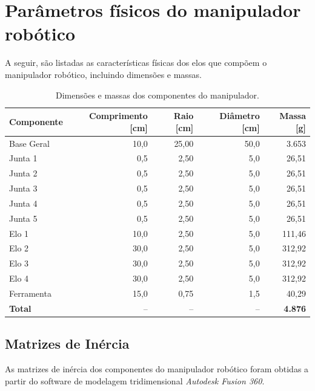 \chapter{Parâmetros físicos do manipulador robótico} 
\label{ApendiceB}
A seguir, são listadas as características físicas dos elos que compõem o manipulador robótico, incluindo dimensões e massas.


\begin{table}[H]
\centering
{\setlength{\tabcolsep}{6pt} 
\caption{Dimensões e massas dos componentes do manipulador.}
\label{tab:dimensoes_massas_cm_g}
\begin{tabular}{l rrrr}
\hline
\textbf{Componente} & \textbf{Comprimento [cm]} & \textbf{Raio [cm]} & \textbf{Diâmetro [cm]} & \textbf{Massa [g]} \\
\hline
Base Geral   & 10,0   & 25,00  & 50,0  & 3.653   \\
Junta 1      & 0,5  & 2,50   & 5,0   & 26,51  \\
Junta 2      & 0,5  & 2,50   & 5,0   & 26,51  \\
Junta 3      & 0,5  & 2,50   & 5,0   & 26,51  \\
Junta 4      & 0,5  & 2,50  & 5,0   & 26,51  \\
Junta 5      & 0,5  & 2,50   & 5,0   & 26,51  \\
Elo 1        & 10,0   & 2,50   & 5,0   & 111,46 \\
Elo 2        & 30,0   & 2,50   & 5,0   & 312,92 \\
Elo 3        & 30,0   & 2,50   & 5,0   & 312,92 \\
Elo 4        & 30,0   & 2,50   & 5,0   & 312,92 \\
Ferramenta   & 15,0   & 0,75  & 1,5   & 40,29  \\
\hline
\textbf{Total} & -- & -- & -- & \textbf{4.876} \\
\hline
\end{tabular}}
\end{table}


\section{Matrizes de Inércia}
As matrizes de inércia dos componentes do manipulador robótico foram obtidas a partir do software de modelagem tridimensional \emph{Autodesk Fusion 360}. 

